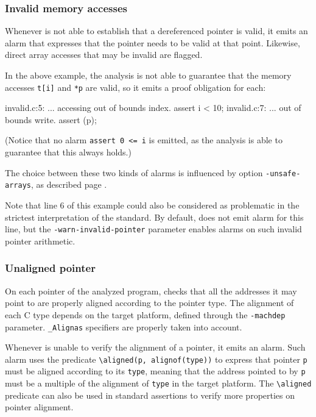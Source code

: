 \documentclass{frama-c-book}
\begin{document}
\subsubsection{Invalid memory accesses}
Whenever \Eva{} is not able to establish that
a dereferenced pointer is valid, it emits an alarm that expresses
that the pointer needs to be valid at that point. Likewise, direct
array accesses that may be invalid are flagged.

In the above example, the analysis is not able to guarantee that
the memory accesses \lstinline|t[i]| and \lstinline|*p| are valid,
so it emits a proof obligation for each:
\begin{logsmath}
invalid.c:5: ... accessing out of bounds index. assert i < 10;
invalid.c:7: ... out of bounds write. assert \valid(p);
\end{logsmath}
(Notice that no alarm \lstinline|assert 0 <= i| is emitted, as the
analysis is able to guarantee that this always holds.)


The choice between these two kinds of alarms is influenced by
option \lstinline|-unsafe-arrays|, as described
page \pageref{unsafe-arrays}.

Note that line 6 of this example could also be considered as
problematic in the strictest interpretation of the standard.
By default, \Eva{} does not emit alarm for this line,
but the \lstinline|-warn-invalid-pointer| parameter enables
alarms on such invalid pointer arithmetic.

\subsubsection{Unaligned pointer}

On each pointer of the analyzed program, \Eva{} checks that all the addresses
it may point to are properly aligned according to the pointer type.
The alignment of each C type depends on the target platform,
defined through the \lstinline|-machdep| parameter. \lstinline|_Alignas|
specifiers are properly taken into account.

Whenever \Eva{} is unable to verify the alignment of a pointer, it emits an
alarm.
Such alarm uses the \acsl{} predicate \lstinline|\aligned(p, alignof(type))|
to express that pointer \lstinline|p| must be aligned according to its
\lstinline|type|, meaning that the address pointed to by \lstinline|p| must be
a multiple of the alignment of \lstinline|type| in the target platform.
The \lstinline|\aligned| predicate can also be used in standard \acsl{}
assertions to verify more properties on pointer alignment.
\end{document}
